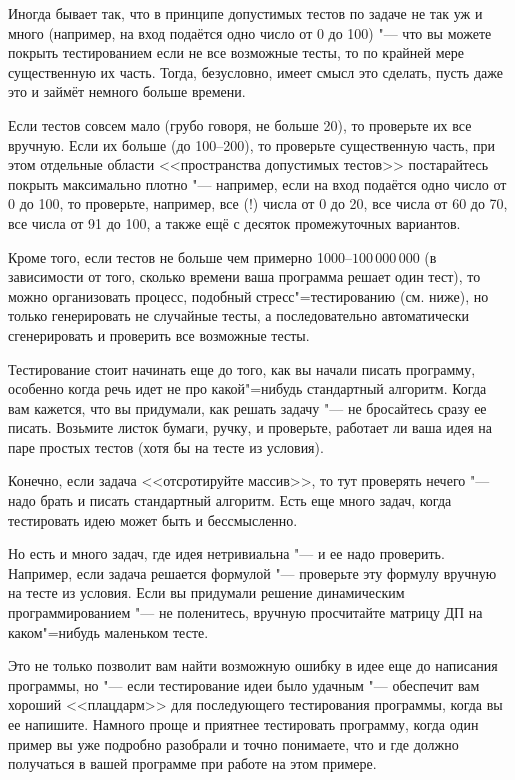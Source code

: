 Иногда бывает так, что в принципе допустимых тестов по задаче не так уж и много (например, на вход подаётся одно число от 0 до 100)
"--- что вы можете покрыть тестированием если не все возможные тесты, то по крайней мере существенную их часть.
Тогда, безусловно, имеет смысл это сделать, пусть даже это и займёт немного больше времени. 

Если тестов совсем мало (грубо говоря, не больше 20), то проверьте их все вручную. 
Если их больше (до 100--200), то проверьте существенную часть, при этом отдельные области <<пространства допустимых тестов>> постарайтесь покрыть
максимально плотно "--- например, если на вход подаётся одно число от 0 до 100, то проверьте, например, все (!) числа от 0 до 20, 
все числа от 60 до 70, все числа от 91 до 100, а также ещё с десяток промежуточных вариантов.

Кроме того, если тестов не больше чем примерно 1000--$100\,000\,000$ (в зависимости от того, сколько времени ваша программа решает один тест),
то можно организовать процесс, подобный стресс"=тестированию (см. ниже), но только генерировать не случайные тесты, 
а последовательно автоматически сгенерировать и проверить все возможные тесты.


 Тестирование стоит начинать еще до того, как вы начали писать программу, 
особенно когда речь идет не про какой"=нибудь стандартный алгоритм. 
Когда вам кажется, что вы придумали, как решать задачу "--- не бросайтесь сразу ее писать. 
Возьмите листок бумаги, ручку, и проверьте, работает ли ваша идея на паре простых тестов (хотя бы на тесте из условия).

Конечно, если задача <<отсротируйте массив>>, то тут проверять нечего "--- надо брать и писать стандартный алгоритм.
Есть еще много задач, когда тестировать идею может быть и бессмысленно.

Но есть и много задач, где идея нетривиальна "--- и ее надо проверить. 
Например, если задача решается формулой "--- проверьте эту формулу вручную на тесте из условия.
Если вы придумали решение динамическим программированием "--- не поленитесь, вручную просчитайте матрицу ДП
на каком"=нибудь маленьком тесте.

Это не только позволит вам найти возможную ошибку в идее еще до написания программы, но "--- если тестирование идеи было удачным
"--- обеспечит вам хороший <<плацдарм>> для последующего тестирования программы, когда вы ее напишите.
Намного проще и приятнее тестировать программу, когда один пример вы уже подробно разобрали и точно понимаете, что 
и где должно получаться в вашей программе при работе на этом примере.

